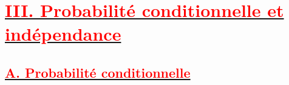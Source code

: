 \documentclass[12pt,a4paper]{article}
\begin{document}

\section*{\underline{\textbf{\textcolor{red}{III. Probabilité conditionnelle et indépendance}}}}
\subsection*{\underline{\textbf{\textcolor{red}{A. Probabilité conditionnelle}}}}
\end{document}
